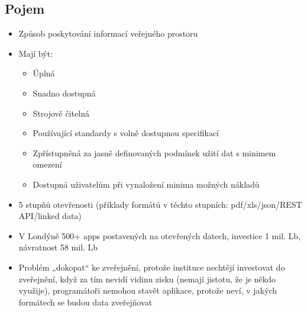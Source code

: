\subsection{Pojem }
\begin{itemize}
      \item Způsob poskytování informací veřejného prostoru
      \item Mají být:
            \begin{itemize}
                  \item Úplná
                  \item Snadno dostupná
                  \item Strojově čitelná
                  \item Používající standardy s volně dostupnou specifikací
                  \item Zpřístupněná za jasně definovaných podmínek užití dat s minimem omezení
                  \item Dostupná uživatelům při vynaložení minima možných nákladů
            \end{itemize}
      \item 5 stupňů otevřenosti (příklady formátů v těchto stupních: pdf/xls/json/REST API/linked data)
      \item V Londýně 500+ apps postavených na otevřených datech, investice 1 mil. Lb, návratnost 58
            mil. Lb
      \item Problém „dokopat“ ke zveřejnění, protože instituce nechtějí investovat do zveřejnění, když za
            tím nevidí vidinu zisku (nemají jistotu, že je někdo využije), programátoři nemohou stavět
            aplikace, protože neví, v jakých formátech se budou data zveřejňovat


\end{itemize}


